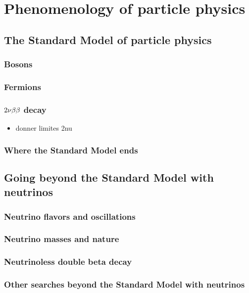 \chapter{Phenomenology of particle physics}
\label{ch:pheno}

\section{The Standard Model of particle physics}
\subsection{Bosons}
\subsection{Fermions}
\subsection{$2\nu\beta\beta$ decay}

\begin{itemize}
\item donner limites 2nu
\end{itemize}

\subsection{Where the Standard Model ends}
\section{Going beyond the Standard Model with neutrinos}
\subsection{Neutrino flavors and oscillations}
\subsection{Neutrino masses and nature}
\label{subsec:nu_mass_nature}
\subsection{Neutrinoless double beta decay}
\label{subsec:0nubb}
\subsection{Other searches beyond the Standard Model with neutrinos}


